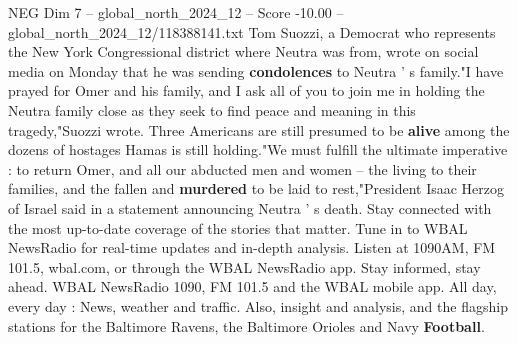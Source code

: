 \begin{textsample}{NEG Dim 7 – global\_north\_2024\_12 – Score -10.00 – global\_north\_2024\_12/118388141.txt}
Tom Suozzi, a Democrat who represents the New York Congressional district where Neutra was from, wrote on social media on Monday that he was sending \textbf{condolences} to Neutra ' s family."I have prayed for Omer and his family, and I ask all of you to join me in holding the Neutra family close as they seek to find peace and meaning in this tragedy,"Suozzi wrote.
Three Americans are still presumed to be \textbf{alive} among the dozens of hostages Hamas is still holding."We must fulfill the ultimate imperative : to return Omer, and all our abducted men and women -- the living to their families, and the fallen and \textbf{murdered} to be laid to rest,"President Isaac Herzog of Israel said in a statement announcing Neutra ' s death.
Stay connected with the most up-to-date coverage of the stories that matter.
Tune in to WBAL NewsRadio for real-time updates and in-depth analysis.
Listen at 1090AM, FM 101.5, wbal.com, or through the WBAL NewsRadio app.
Stay informed, stay ahead.
WBAL NewsRadio 1090, FM 101.5 and the WBAL mobile app.
All day, every day : News, weather and traffic.
Also, insight and analysis, and the flagship stations for the Baltimore Ravens, the Baltimore Orioles and Navy \textbf{Football}.

\end{textsample}
